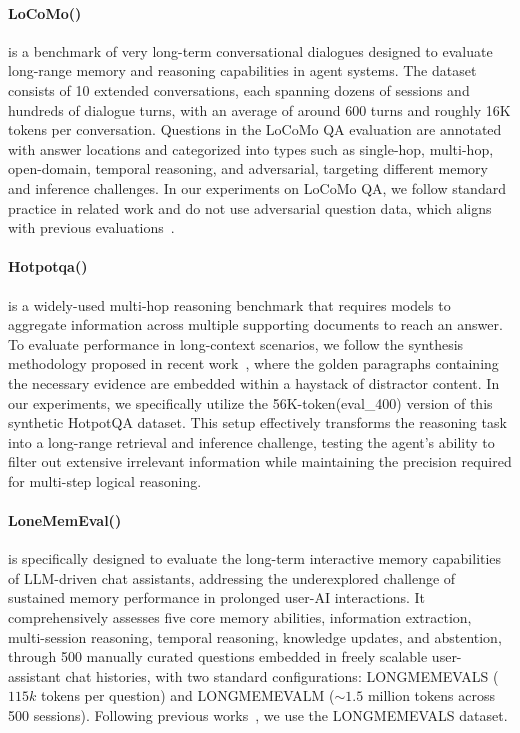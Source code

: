 \documentclass[11pt, a4paper]{lumia}
\begin{document}
\paragraph{LoCoMo(\citep{maharana2024evaluating})} is a benchmark of very long-term conversational dialogues designed to evaluate long-range memory and reasoning capabilities in agent systems. The dataset consists of 10 extended conversations, each spanning dozens of sessions and hundreds of dialogue turns, with an average of around 600 turns and roughly 16K tokens per conversation. Questions in the LoCoMo QA evaluation are annotated with answer locations and categorized into types such as single-hop, multi-hop, open-domain, temporal reasoning, and adversarial, targeting different memory and inference challenges. In our experiments on LoCoMo QA, we follow standard practice in related work and do not use adversarial question data, which aligns with previous evaluations~\citep{Chhikara2025mem0, xuAMEMAgenticMemory2025}.

\paragraph{Hotpotqa(\citep{yang2018hotpotqadatasetdiverseexplainable})} is a widely-used multi-hop reasoning benchmark that requires models to aggregate information across multiple supporting documents to reach an answer. To evaluate performance in long-context scenarios, we follow the synthesis methodology proposed in recent work~\citep{yu2025memagent,yanGeneralAgenticMemory2025}, where the golden paragraphs containing the necessary evidence are embedded within a haystack of distractor content. In our experiments, we specifically utilize the 56K-token(eval\_400) version of this synthetic HotpotQA dataset. This setup effectively transforms the reasoning task into a long-range retrieval and inference challenge, testing the agent's ability to filter out extensive irrelevant information while maintaining the precision required for multi-step logical reasoning.

\paragraph{LoneMemEval(\citep{DBLP:conf/iclr/WuWYZCY25})} is specifically designed to evaluate the long-term interactive memory capabilities of LLM-driven chat assistants, addressing the underexplored challenge of sustained memory performance in prolonged user-AI interactions. It comprehensively assesses five core memory abilities, information extraction, multi-session reasoning, temporal reasoning, knowledge updates, and abstention, through 500 manually curated questions embedded in freely scalable user-assistant chat histories, with two standard configurations: LONGMEMEVALS ($115k$ tokens per question) and LONGMEMEVALM ($\sim1.5$ million tokens across 500 sessions). Following previous works~\citep{DBLP:journals/corr/abs-2509-25911,Rasmussen2025Zep,fang2025lightmem}, we use the LONGMEMEVALS dataset.
\end{document}
